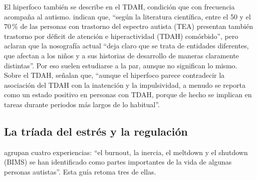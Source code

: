 El hiperfoco también se describe en el TDAH, condición que con frecuencia acompaña al autismo. \citet{hours2022} indican que, \enquote{según la literatura científica, entre el 50 y el 70\,\% de las personas con trastorno del espectro autista (TEA) presentan también trastorno por déficit de atención e hiperactividad (TDAH) comórbido}, pero aclaran que la nosografía actual \enquote{deja claro que se trata de entidades diferentes, que afectan a los niños y a sus historias de desarrollo de maneras claramente distintas}. Por eso suelen estudiarse a la par, aunque no significan lo mismo. Sobre el TDAH, \citet{ashinoff2021} señalan que, \enquote{aunque el hiperfoco parece contradecir la asociación del TDAH con la inatención y la impulsividad, a menudo se reporta como un estado positivo en personas con TDAH, porque de hecho se implican en tareas durante periodos más largos de lo habitual}.

\subsection{La tríada del estrés y la regulación}

\citet{phung2021} agrupan cuatro experiencias: \enquote{el burnout, la inercia, el meltdown y el shutdown (BIMS) se han identificado como partes importantes de la vida de algunas personas autistas}. Esta guía retoma tres de ellas.

